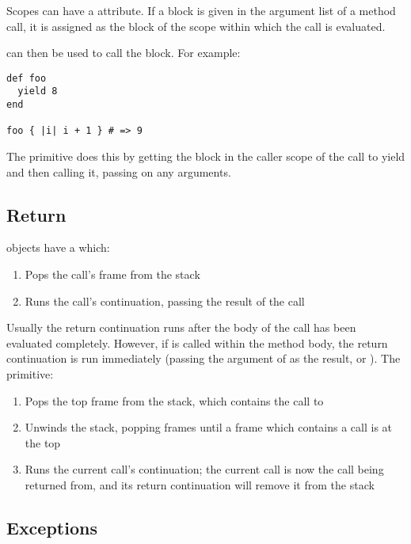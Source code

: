 Scopes can have a  attribute. If a block is given in the argument list of a method call, it is assigned as the block of the scope within which the call is evaluated.

 can then be used to call the block. For example:

\begin{lstlisting}
def foo
  yield 8
end

foo { |i| i + 1 } # => 9
\end{lstlisting}

The  primitive does this by getting the block in the caller scope of the call to yield and then calling it, passing on any arguments.

\subsection{Return}

 objects have a  which:

\begin{enumerate}
  \item Pops the call's frame from the stack
  \item Runs the call's continuation, passing the result of the call
\end{enumerate}

Usually the return continuation runs after the body of the call has been evaluated completely. However, if  is called within the method body, the return continuation is run immediately (passing the argument of  as the result, or ). The  primitive:

\begin{enumerate}
  \item Pops the top frame from the stack, which contains the call to 
  \item Unwinds the stack, popping frames until a frame which contains a call is at the top
  \item Runs the current call's continuation; the current call is now the call being returned from, and its return continuation will remove it from the stack
\end{enumerate}

\subsection{Exceptions}
\label{sec:exceptions}

